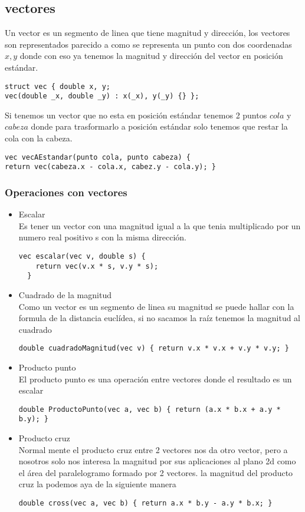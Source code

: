 \subsection{vectores}
Un vector es un segmento de linea que tiene magnitud y dirección, los vectores son representados parecido a como se
representa un punto con dos coordenadas $x, y$ donde con eso ya tenemos la magnitud y dirección del vector en posición estándar.
\begin{lstlisting}[style=C]
struct vec { double x, y;
vec(double _x, double _y) : x(_x), y(_y) {} };
\end{lstlisting}
Si tenemos un vector que no esta en posición estándar tenemos 2 puntos $cola$ y $cabeza$ donde para trasformarlo a posición estándar
solo tenemos que restar la cola con la cabeza.
\begin{lstlisting}[style=C]
vec vecAEstandar(punto cola, punto cabeza) {
return vec(cabeza.x - cola.x, cabez.y - cola.y); }
\end{lstlisting}
\subsubsection{Operaciones con vectores}
\begin{itemize}
  \item Escalar
  \\
  Es tener un vector con una magnitud igual a la que tenia multiplicado por un numero real positivo s con la misma dirección.
  \begin{lstlisting}[style=C]
  vec escalar(vec v, double s) {
    return vec(v.x * s, v.y * s);
  }
  \end{lstlisting}
  \item Cuadrado de la magnitud
  \\
  Como un vector es un segmento de linea su magnitud se puede hallar con la formula de la distancia euclídea, si
  no sacamos la raíz tenemos la magnitud al cuadrado
  \begin{lstlisting}[style=C]
  double cuadradoMagnitud(vec v) { return v.x * v.x + v.y * v.y; }
  \end{lstlisting}
  \item Producto punto
  \\
  El producto punto es una operación entre vectores donde el resultado es un escalar
  \begin{lstlisting}[style=C]
  double ProductoPunto(vec a, vec b) { return (a.x * b.x + a.y * b.y); }
  \end{lstlisting}
  \item Producto cruz
  \\
  Normal mente el producto cruz entre 2 vectores nos da otro vector, pero a nosotros solo nos interesa la magnitud por sus
  aplicaciones al plano 2d como el área del paralelogramo formado por 2 vectores. la magnitud del producto cruz la podemos aya de la
  siguiente manera
  \begin{lstlisting}[style=C]
  double cross(vec a, vec b) { return a.x * b.y - a.y * b.x; }
  \end{lstlisting}
\end{itemize}
